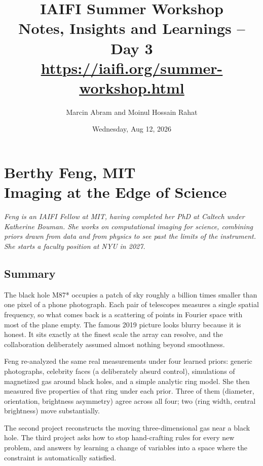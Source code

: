 \documentclass[11pt]{article}
\title{IAIFI Summer Workshop\\[12pt]
\large{Notes, Insights and Learnings -- Day 3}\\[3pt]
\large{\url{https://iaifi.org/summer-workshop.html}}}
\author{Marcin Abram and Moinul Hossain Rahat}
\date{Wednesday, Aug 12, 2026}
\begin{document}
\maketitle

\section{Berthy Feng, MIT\\ {\large Imaging at the Edge of Science}}

\emph{Feng is an IAIFI Fellow at MIT, having completed her PhD at Caltech under Katherine Bouman. She works on computational imaging for science, combining priors drawn from data and from physics to see past the limits of the instrument. She starts a faculty position at NYU in 2027.}

\subsection*{Summary}
The black hole M87* occupies a patch of sky roughly a billion times smaller than one pixel of a phone photograph. Each pair of telescopes measures a single spatial frequency, so what comes back is a scattering of points in Fourier space with most of the plane empty. The famous 2019 picture looks blurry because it is honest. It sits exactly at the finest scale the array can resolve, and the collaboration deliberately assumed almost nothing beyond smoothness.

Feng re-analyzed the same real measurements under four learned priors: generic photographs, celebrity faces (a deliberately absurd control), simulations of magnetized gas around black holes, and a simple analytic ring model. She then measured five properties of that ring under each prior. Three of them (diameter, orientation, brightness asymmetry) agree across all four; two (ring width, central brightness) move substantially.

The second project reconstructs the moving three-dimensional gas near a black hole. The third project asks how to stop hand-crafting rules for every new problem, and answers by learning a change of variables into a space where the constraint is automatically satisfied.
\end{document}
